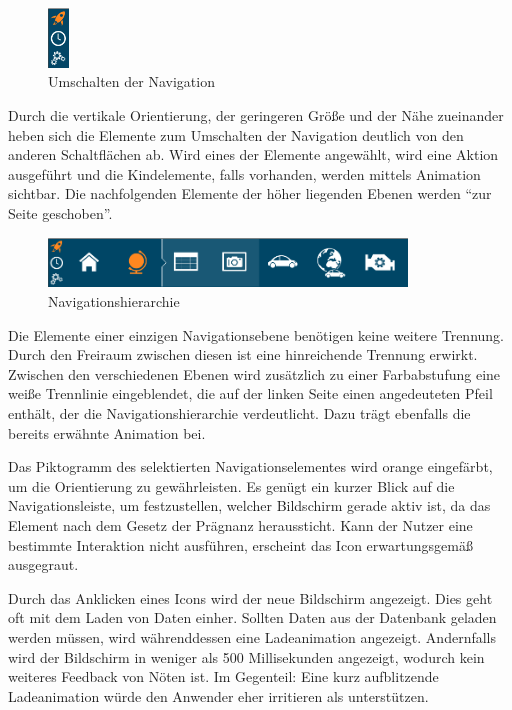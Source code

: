 \begin{figure}[H]
 \centering
 \includegraphics[width=0.05\textwidth]{grafiken/ribbon.png}
 \caption{Umschalten der Navigation}
 \label{fig:ribbon}
\end{figure}
Durch die vertikale Orientierung, der geringeren Größe und der Nähe zueinander heben sich die Elemente zum Umschalten der Navigation deutlich von den anderen Schaltflächen ab. Wird eines der Elemente angewählt, wird eine Aktion ausgeführt und die Kindelemente, falls vorhanden, werden mittels Animation sichtbar. Die nachfolgenden Elemente der höher liegenden Ebenen werden \enquote{zur Seite geschoben}.\par
\begin{figure}[H]
 \centering
 \includegraphics[width=0.85\textwidth]{grafiken/navi.png}
 \caption{Navigationshierarchie}
 \label{fig:navi}
\end{figure}
Die Elemente einer einzigen Navigationsebene benötigen keine weitere Trennung. Durch den Freiraum zwischen diesen ist eine hinreichende Trennung erwirkt. Zwischen den verschiedenen Ebenen wird zusätzlich zu einer Farbabstufung eine weiße Trennlinie eingeblendet, die auf der linken Seite einen angedeuteten Pfeil enthält, der die Navigationshierarchie verdeutlicht. Dazu trägt ebenfalls die bereits erwähnte Animation bei.\par
Das Piktogramm des selektierten Navigationselementes wird orange eingefärbt, um die Orientierung zu gewährleisten. Es genügt ein kurzer Blick auf die Navigationsleiste, um festzustellen, welcher Bildschirm gerade aktiv ist, da das Element nach dem Gesetz der Prägnanz heraussticht. Kann der Nutzer eine bestimmte Interaktion nicht ausführen, erscheint das Icon erwartungsgemäß ausgegraut.\par
Durch das Anklicken eines Icons wird der neue Bildschirm angezeigt. Dies geht oft mit dem Laden von Daten einher. Sollten Daten aus der Datenbank geladen werden müssen, wird währenddessen eine Ladeanimation angezeigt. Andernfalls wird der Bildschirm in weniger als 500 Millisekunden angezeigt, wodurch kein weiteres Feedback von Nöten ist. Im Gegenteil: Eine kurz aufblitzende Ladeanimation würde den Anwender eher irritieren als unterstützen.\par
